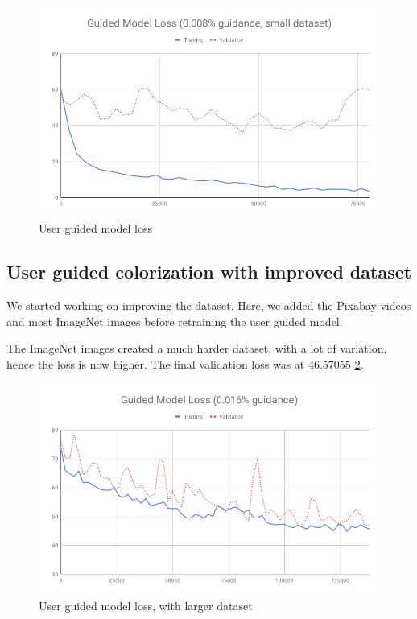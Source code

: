 \documentclass[12pt,openright,oneside,a4paper,english]{abntex2}
\begin{document}
\begin{otherlanguage}{english}
    \begin{figure}[!htb]
    \centering
    \includegraphics[width=\textwidth]{loss/Guided_0_008}
    \caption{User guided model loss}
    \label{loss_0_008}
    \end{figure}

    \subsection{User guided colorization with improved dataset}

    We started working on improving the dataset. Here, we added the Pixabay videos and most ImageNet images before retraining the user guided model.

    The ImageNet images created a much harder dataset, with a lot of variation, hence the loss is now higher. The final validation loss was at 46.57055 \ref{loss_0_016}.

    \begin{figure}[!htb]
    \centering
    \includegraphics[width=\textwidth]{loss/Guided_0_016}
    \caption{User guided model loss, with larger dataset}
    \label{loss_0_016}
    \end{figure}


\end{otherlanguage}
\end{document}
